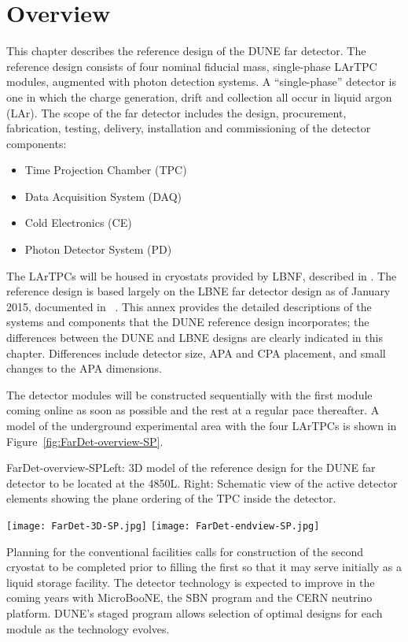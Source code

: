 \section{Overview}
\label{sec:detectors-fd-ref-ov}


This chapter describes the reference design of the DUNE far detector.
The reference design consists of four nominal  fiducial
mass, single-phase LArTPC modules, augmented with photon detection
systems.  A ``single-phase'' detector is one in which the charge
generation, drift and collection all occur in liquid argon (LAr). The
scope of the far detector includes the design, procurement,
fabrication, testing, delivery, installation and commissioning of the
detector components:
\begin{itemize}
\item Time Projection Chamber (TPC)
\item Data Acquisition System (DAQ)  
\item Cold Electronics (CE)
\item Photon Detector System (PD)
\end{itemize}
The LArTPCs will be housed in cryostats provided by LBNF, described in
\vollbnf. The reference design is based largely on the LBNE far
detector design as of January 2015, documented in \anxlbnefd~\cite{cdr-annex-lbne-design}. This
annex provides the detailed descriptions of the systems and components
that the DUNE reference design incorporates; the differences between
the DUNE and LBNE designs are clearly indicated in this
chapter. Differences include detector size, APA and CPA
placement, and small changes to the APA dimensions.

The detector modules will be constructed sequentially
with the first module coming online as soon as possible and the rest
at a regular pace thereafter. A model of the underground experimental area with
the four  LArTPCs is shown in
Figure~\ref{fig:FarDet-overview-SP}. 
\begin{cdrfigure}{FarDet-overview-SP}{Left: 3D model of the reference design for the DUNE far detector to be located at the 4850L. Right: Schematic view of the active detector elements showing the plane ordering of the TPC inside the detector.}
\centering
\begin{minipage}[b]{1.0\textwidth}
\begin{center}
\texttt{[image: FarDet-3D-SP.jpg]}
\texttt{[image: FarDet-endview-SP.jpg]}
\end{center}
\end{minipage}
\end{cdrfigure}
Planning for the conventional facilities calls for construction of the
second cryostat to be completed prior to filling the first so that it
may serve initially as a liquid storage facility.  The detector
technology is expected to improve in the coming years with MicroBooNE,
the SBN program and the CERN neutrino platform.  DUNE's staged program
allows selection of optimal designs for each module as the technology
evolves.


